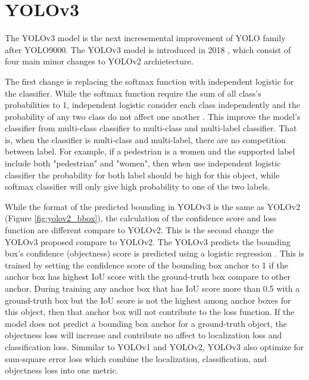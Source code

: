 \section{YOLOv3}  \label{sec:yolov3}

The YOLOv3 model is the next incresemental improvement of YOLO family after YOLO9000. The YOLOv3 model is introduced in 2018 \cite{yolov3_2018}, which consist of four main minor changes to YOLOv2 archietecture. 

The first change is replacing the softmax function with independent logistic for the classifier. While the softmax function require the sum of all class's probabilities to 1, independent logistic consider each class independently and the probability of any two class do not affect one another \cite{yolov3_2018}. This improve the model's classifier from multi-class classifier to multi-class and multi-label classifier. That is, when the classifier is multi-class and multi-label, there are no competition between label. For example, if a pedestrian is a women and the supported label include both "pedestrian" and "women", then when use  independent logistic classifier the probability for both label should be high for this object, while softmax classifier will only give high probability to one of the two labels.

While the format of the predicted bounding in YOLOv3 is the same as YOLOv2 (Figure \ref{fig:yolov2_bbox}), the calculation of the confidence score and loss function are different compare to YOLOv2. This is the second change the YOLOv3 proposed compare to YOLOv2. The YOLOv3 predicts the bounding box's confidence (objectness) score is predicted using a logistic regression \cite{yolov3_2018}. This is trained by setting the confidence score of the bounding box anchor to 1 if the anchor box has highest IoU score with the ground-truth box compare to other anchor. During training any anchor box that has IoU score more than 0.5 with a ground-truth box but the IoU score is not the highest among anchor boxes for this object, then that anchor box will not contribute to the loss function. If the model does not predict a bounding box anchor for a ground-truth object, the objectness loss will increase and contribute no affect to localization loss and classification loss. Simmilar to YOLOv1 and YOLOv2, YOLOv3 also optimize for sum-square error loss which combine the localization, classification, and objectness loss into one metric. 


